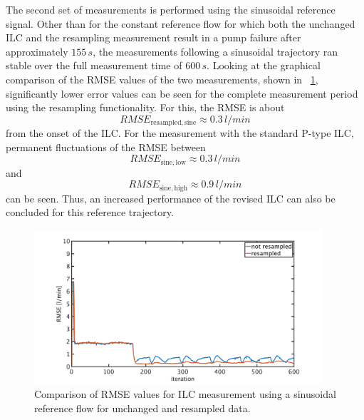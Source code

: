 \pagebreak
The second set of measurements is performed using the sinusoidal reference signal. Other than for the constant reference flow for which both the unchanged ILC and the resampling measurement result in a pump failure after approximately $155\,s$, the measurements following a sinusoidal trajectory ran stable over the full measurement time of $600\,s$.
Looking at the graphical comparison of the RMSE values of the two measurements, shown in \figurename~\ref{fig:RMSE_ilc_var_dist_comp_sine}, significantly lower error values can be seen for the complete measurement period using the resampling functionality. For this, the RMSE is about
\begin{equation}
RMSE_{\mathrm{resampled,sine}}\approx0.3\,l/min
\end{equation}
from the onset of the ILC. For the measurement with the standard P-type ILC, permanent fluctuations of the RMSE between
\begin{equation}
 RMSE_{\mathrm{sine,low}}\approx0.3\,l/min
\end{equation}
and
\begin{equation}
 RMSE_{\mathrm{sine,high}}\approx0.9\,l/min
\end{equation}
can be seen.
Thus, an increased performance of the revised ILC can also be concluded for this reference trajectory.
\begin{figure}[ht!]
  \centering
  \includegraphics[width=0.95\textwidth]{images/chapt_5/ILC/RMSE_ilc_var_dist_comp_sine.pdf}
  \caption[Comparison of RMSE values for ILC measurement using a sinusoidal reference flow for unchanged and resampled data]{Comparison of RMSE values for ILC measurement using a sinusoidal reference flow for unchanged and resampled data.}
  \label{fig:RMSE_ilc_var_dist_comp_sine}
\end{figure}


